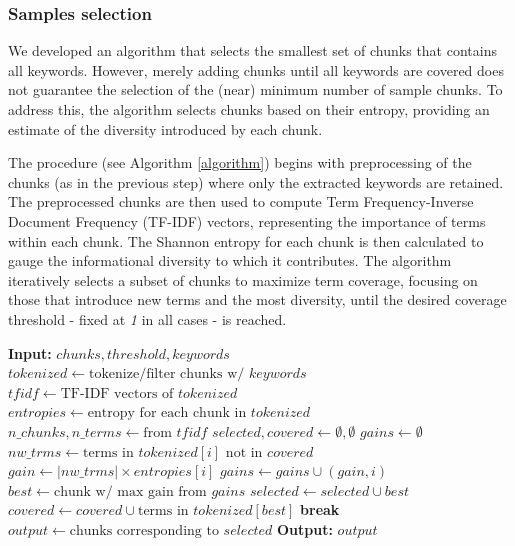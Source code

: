 \documentclass[conference]{IEEEtran}
\begin{document}
\subsubsection{Samples selection}
We developed an algorithm that selects the smallest set of chunks that contains all keywords. However, merely adding chunks until all keywords are covered does not guarantee the selection of the (near) minimum number of sample chunks. To address this, the algorithm selects chunks based on their entropy, providing an estimate of the diversity introduced by each chunk. 

The procedure (see Algorithm \ref{algorithm}) begins with preprocessing of the chunks (as in the previous step) where only the extracted keywords are retained. The preprocessed chunks are then used to compute Term Frequency-Inverse Document Frequency (TF-IDF) vectors, representing the importance of terms within each chunk. The Shannon entropy for each chunk is then calculated to gauge the informational diversity to which it contributes. The algorithm iteratively selects a subset of chunks to maximize term coverage, focusing on those that introduce new terms and the most diversity, until the desired coverage threshold - fixed at \textit{1} in all cases - is reached.


\begin{algorithm}[!th]
\caption{Samples Selection}
\begin{algorithmic}
\State \textbf{Input:} $chunks, threshold, keywords$
\State $tokenized \gets \text{tokenize/filter chunks w/ } keywords$
\State $tfidf \gets \text{TF-IDF vectors of } tokenized$
\State $entropies \gets \text{entropy for each chunk in } tokenized$
\State $n\_chunks, n\_terms \gets \text{from } tfidf$
\State $selected, covered \gets \emptyset, \emptyset$
    \State $gains \gets \emptyset$
            \State $nw\_trms \gets \text{terms in $tokenized[i]$ not in } covered$
            \State $gain \gets |nw\_trms| \times entropies[i]$
            \State $gains \gets gains \cup (gain, i)$
        \EndIf
    \EndFor
        \State $best \gets \text{chunk w/ max gain from } gains$
        \State $selected \gets selected \cup best$
        \State $covered \gets covered \cup \text{terms in } tokenized[best]$
    \Else
        \State \textbf{break}
    \EndIf
\EndWhile
\State $output \gets \text{chunks corresponding to } selected$
\State \textbf{Output: } $output$
\end{algorithmic}
\label{algorithm}
\end{algorithm}
\end{document}
